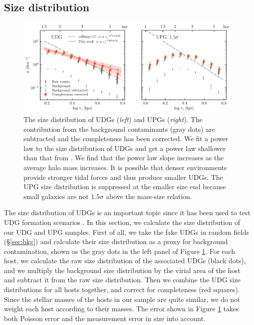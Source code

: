 \documentclass[twocolumn,astrosymb,twocolappendix]{aastex631}
\begin{document}
\begin{CJK*}{UTF8}{gbsn}
\subsection{Size distribution}\label{sec:size_distr}

\begin{figure}
	\vbox{ 
		\centering
		\includegraphics[width=1\linewidth]{size_distribution.pdf}
	}
    \caption{The size distribution of UDGs (\textit{left}) and UPGs (\textit{right}). The contribution from the background contaminants (gray dots) are subtracted and the completeness has been corrected. We fit a power law to the size distribution of UDGs and get a power law shallower than that from \citet{vdBurg2016,vdBurg2017}. We find that the power law slope increases as the average halo mass increases. It is possible that denser environments provide stronger tidal forces and thus produce smaller UDGs. The UPG size distribution is suppressed at the smaller size end because small galaxies are not $1.5\sigma$ above the mass-size relation.
    }
    \label{fig:size_distribution}
\end{figure}

The size distribution of UDGs is an important topic since it has been used to test UDG formation scenarios \citep[e.g.,][]{Amorisco2016,vdBurg2017}. In this section, we calculate the size distribution of our UDG and UPG samples. First of all, we take the fake UDGs in random fields (\S \ref{sec:bkg}) and calculate their size distribution as a proxy for background contamination, shown as the gray dots in the left panel of Figure \ref{fig:size_distribution}. For each host, we calculate the raw size distribution of the associated UDGs (black dots), and we multiply the background size distribution by the virial area of the host and subtract it from the raw size distribution. Then we combine the UDG size distributions for all hosts together, and correct for completeness (red squares). Since the stellar masses of the hosts in our sample are quite similar, we do not weight each host according to their masses. The error shown in Figure \ref{fig:size_distribution} takes both Poisson error and the measurement error in size into account.


\end{CJK*}
\end{document}
